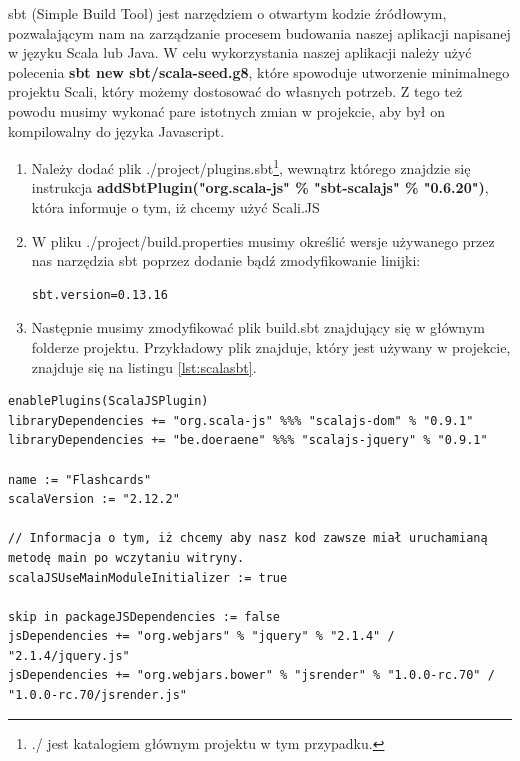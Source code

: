 sbt (Simple Build Tool) jest narzędziem o otwartym kodzie źródłowym, pozwalającym nam na zarządzanie procesem budowania naszej aplikacji napisanej w języku Scala lub Java. W celu wykorzystania naszej aplikacji należy użyć polecenia \textbf{sbt new sbt/scala-seed.g8}, które spowoduje utworzenie minimalnego projektu Scali, który możemy dostosować do własnych potrzeb.
Z tego też powodu musimy wykonać pare istotnych zmian w projekcie, aby był on kompilowalny do języka Javascript.


\begin{enumerate}
	\item Należy dodać plik ./project/plugins.sbt\footnote{./ jest katalogiem głównym projektu w tym przypadku.}, wewnątrz którego znajdzie się instrukcja \textbf{addSbtPlugin("org.scala-js" \% "sbt-scalajs" \% "0.6.20")}, która informuje o tym, iż chcemy użyć Scali.JS
	\item W pliku ./project/build.properties musimy określić wersje używanego przez nas narzędzia sbt poprzez dodanie bądź zmodyfikowanie linijki: 
	\begin{lstlisting}[numbers = none]
		sbt.version=0.13.16
	\end{lstlisting}
	\item Następnie musimy zmodyfikować plik build.sbt znajdujący się w głównym folderze projektu. Przykładowy plik znajduje, który jest używany w projekcie, znajduje się na listingu \ref{lst:scalasbt}.
\end{enumerate}


\begin{lstlisting}[label={lst:scalasbt},
frame=single, numbers=none,captionpos=b, 
caption={Plik .sbt, który jest wykorzystywany w projekcie.}]
enablePlugins(ScalaJSPlugin)
libraryDependencies += "org.scala-js" %%% "scalajs-dom" % "0.9.1"
libraryDependencies += "be.doeraene" %%% "scalajs-jquery" % "0.9.1"

name := "Flashcards"
scalaVersion := "2.12.2"

// Informacja o tym, iż chcemy aby nasz kod zawsze miał uruchamianą metodę main po wczytaniu witryny.
scalaJSUseMainModuleInitializer := true

skip in packageJSDependencies := false
jsDependencies += "org.webjars" % "jquery" % "2.1.4" / "2.1.4/jquery.js" 
jsDependencies += "org.webjars.bower" % "jsrender" % "1.0.0-rc.70" / "1.0.0-rc.70/jsrender.js"
\end{lstlisting}

